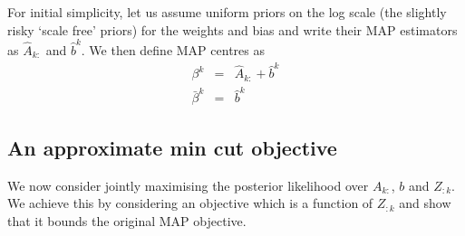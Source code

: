 \documentclass{article}
\numberwithin{equation}{section}
\numberwithin{thm}{section}
\def\IBP{Z}
\def\Weights{A}
\def\bias{b}
\def\centre{\beta}
\begin{document}
For initial simplicity, let us assume uniform priors on the log scale (\ie the slightly risky `scale free' priors) for the weights and bias and write their MAP estimators as $\hat{\Weights}_{k:}$ and $\hat{\bias}^k$. We then define MAP centres as
\begin{eqnarray}
\centre^k & = & \hat{\Weights}_{k:} + \hat{\bias}^k \\
\bar{\centre}^k & = & \hat{\bias}^k
\end{eqnarray}

\subsection{An approximate min cut objective}

We now consider jointly maximising the posterior likelihood over $\Weights_{k:}$, $\bias$ and $\IBP_{:k}$.
We achieve this by considering an objective which is a function of $\IBP_{:k}$ and show that it bounds the original MAP objective.

\end{document}

